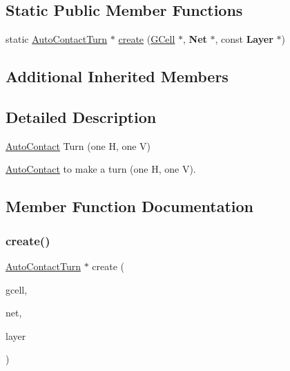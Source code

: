 \subsection*{Static Public Member Functions}
\begin{DoxyCompactItemize}
\item 
static \hyperlink{classKatabatic_1_1AutoContactTurn}{Auto\+Contact\+Turn} $\ast$ \hyperlink{classKatabatic_1_1AutoContactTurn_a9d4adb00ccea486f5478bb24e171bdb3}{create} (\hyperlink{classKatabatic_1_1GCell}{G\+Cell} $\ast$, \textbf{ Net} $\ast$, const \textbf{ Layer} $\ast$)
\end{DoxyCompactItemize}
\subsection*{Additional Inherited Members}


\subsection{Detailed Description}
\hyperlink{classKatabatic_1_1AutoContact}{Auto\+Contact} Turn (one H, one V) 

\hyperlink{classKatabatic_1_1AutoContact}{Auto\+Contact} to make a turn (one H, one V). 

\subsection{Member Function Documentation}
\mbox{\label{classKatabatic_1_1AutoContactTurn_a9d4adb00ccea486f5478bb24e171bdb3}} 
\subsubsection{\texorpdfstring{create()}{create()}}
{\footnotesize\ttfamily \hyperlink{classKatabatic_1_1AutoContactTurn}{Auto\+Contact\+Turn} $\ast$ create (\begin{DoxyParamCaption}\item[{\hyperlink{classKatabatic_1_1GCell}{G\+Cell} $\ast$}]{gcell,  }\item[{\textbf{ Net} $\ast$}]{net,  }\item[{const \textbf{ Layer} $\ast$}]{layer }\end{DoxyParamCaption})\hspace{0.3cm}{\ttfamily [static]}}


